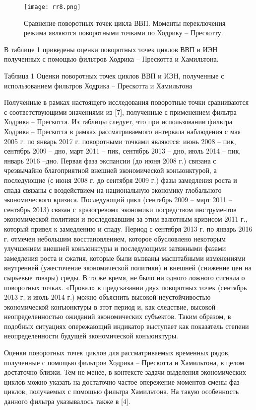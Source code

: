 \documentclass[a4paper,14pt]{extreport}
\begin{document}
	\begin{figure}
		\label{fig:rr8}
		\texttt{[image: rr8.png]}
		\caption{
			Сравнение поворотных точек цикла ВВП. Моменты переключения режима являются поворотными точками по Ходрику – Прескотту.
		}
	\end{figure}	
	
	В таблице 1 приведены оценки поворотных точек циклов ВВП и ИЭН полученных с помощью фильтров Ходрика – Прескотта и Хамильтона. 
	
	Таблица 1 
	Оценки поворотных точек циклов ВВП и ИЭН, полученные с использованием фильтров Ходрика – Прескотта и Хамильтона
	
	
	Полученные в рамках настоящего исследования поворотные точки сравниваются с соответствующими значениями из [7], полученные с применением фильтра Ходрика – Прескотта. Из таблицы следует, что при использовании фильтра Ходрика – Прескотта  в   рамках рассматриваемого интервала наблюдения с мая 2005 г. по январь 2017 г. поворотными точками являются: июнь 2008 – пик, сентябрь 2009 – дно, март 2011 – пик, сентябрь 2013 – дно, июль 2014 – пик, январь 2016 –дно. Первая фаза экспансии (до июня 2008 г.) связана с чрезвычайно благоприятной внешней экономической конъюнктурой, а последующие (с июня 2008 г. до сентября 2009 г.) фазы замедления роста и спада связаны с воздействием на национальную экономику глобального экономического кризиса. Последующий цикл (сентябрь 2009 – март 2011 – сентябрь 2013) связан с «разогревом» экономики посредством инструментов экономической политики и последовавшим за этим валютным кризисом 2011 г., который привел к замедлению и спаду. Период с сентября 2013 г. по январь 2016 г. отмечен небольшим восстановлением, которое обусловлено некоторым улучшением внешней конъюнктуры и последующими затяжными фазами замедления роста и сжатия, которые были вызваны масштабными изменениями внутренней (ужесточение экономической политики) и внешней (снижение цен на сырьевые товары) среды. В то же время, не было ни одного ложного сигнала о поворотных точках. «Провал» в предсказании двух поворотных точек (сентябрь 2013 г. и июль 2014 г.) можно объяснить высокой неустойчивостью экономической конъюнктуры в этот период и, как следствие, высокой неопределенностью ожиданий экономических субъектов. Таким образом, в подобных ситуациях опережающий индикатор выступает как показатель степени неопределенности будущей экономической конъюнктуры.
	
	Оценки поворотных точек циклов для рассматриваемых временных рядов, полученные с помощью фильтров Ходрика – Прескотта и Хамильтона, в целом достаточно близки. Тем не менее, в контексте задачи выделения экономических циклов можно указать на достаточно частое опережение моментов смены фаз циклов, получаемых с помощью фильтра Хамильтона. На такую особенность данного фильтра указывалось также в [4].
	
\end{document}
